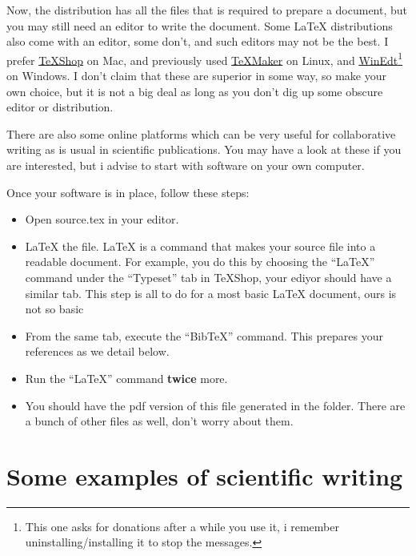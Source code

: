 \documentclass[aps,twocolumn,showpacs,preprintnumbers,nofootinbib,prl,superscriptaddress,groupedaddress]{revtex4-2}
\begin{document}
Now, the distribution has all the files that is required to prepare a document, but you may still need an editor
to write the document. Some LaTeX distributions also come with an editor, some don't, and such editors may
not be the best. I prefer \href{https://pages.uoregon.edu/koch/texshop/}{TeXShop} on Mac, and previously
used \href{http://www.xm1math.net/texmaker/}{TeXMaker} on Linux, and
\href{http://www.winedt.com/}{WinEdt}\footnote{This one asks for donations after a while you use it, i remember 
uninstalling/installing it to stop the messages.} on Windows. I don't claim that these are superior in some way,
so make your own choice, but it is not a big deal as long as you don't dig up some obscure editor or
distribution.

There are also some online platforms which can be very useful for collaborative writing as is usual in scientific
publications. You may have a look at these if you are interested, but i advise to start with software on your own 
computer.

Once your software is in place, follow these steps:
\begin{itemize}
\item Open source.tex in your editor.

\item LaTeX the file. LaTeX is a command that makes your source file into a readable document.
For example, you do this by choosing the ``LaTeX'' command under the ``Typeset'' tab in TeXShop, your ediyor should
have a similar tab. This step is all to do for a most basic LaTeX document, ours is not so basic

\item From the same tab, execute the ``BibTeX'' command. This prepares your references as we detail below.
\item Run the ``LaTeX'' command \textbf{twice} more.

\item You should have the pdf version of this file generated in the folder. There are a bunch of other files as well, don't
worry about them.

\end{itemize}

\section{Some examples of scientific writing}
\end{document}
